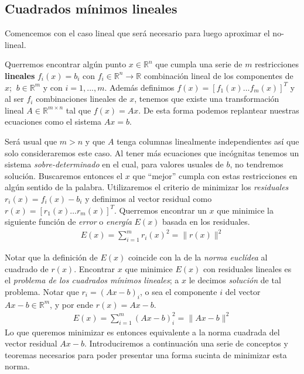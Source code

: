 \documentclass[ twoside,openright,titlepage,numbers=noenddot,%
                headinclude,footinclude,cleardoublepage=empty,abstract=on,
                BCOR=-5mm,paper=a4,fontsize=11pt
                ]{scrreprt}
\newcommand{\R}{\mathbb{R}}
\begin{document}
\hypertarget{cuadrados-muxednimos-lineales}{%
\subsection{Cuadrados mínimos
lineales}\label{cuadrados-muxednimos-lineales}}

Comencemos con el caso lineal que será necesario para luego aproximar el
no-lineal.

Querremos encontrar algún punto \(x \in \R^n\) que cumpla una serie de
\(m\) restricciones \textbf{lineales} \(f_i(x) = b_i\) con
\(f_i \in \R^n \rightarrow \R\) combinación lineal de los componentes de
\(x\); \(\ b \in \R^m\) y con \(i = 1, ..., m\). Además definimos
\(f(x) = [f_1(x) \dots f_m(x)]^T\) y al ser \(f_i\) combinaciones
lineales de \(x\), tenemos que existe una transformación lineal
\(A \in \R^{m \times n}\) tal que \(f(x) = Ax\). De esta forma podemos
replantear nuestras ecuaciones como el sistema \(Ax = b\).

Será usual que \(m > n\) y que \(A\) tenga columnas linealmente
independientes así que solo consideraremos este caso. Al tener más
ecuaciones que incógnitas tenemos un sistema \emph{sobre-determinado} en
el cual, para valores usuales de \(b\), no tendremos solución.
Buscaremos entonces el \(x\) que ``mejor'' cumpla con estas
restricciones en algún sentido de la palabra. Utilizaremos el criterio
de minimizar los \emph{residuales} \(r_i(x) = f_i(x) - b_i\) y definimos
al vector residual como \(r(x) = [r_1(x) \dots r_m(x)]^T\). Querremos
encontrar un \(x\) que minimice la siguiente función de \emph{error} o
\emph{energía} \(E(x)\) basada en los residuales. \begin{align}
E(x) = \sum_{i=1}^m{r_i(x) ^ 2} = \| r(x) \| ^ 2
\end{align}

Notar que la definición de \(E(x)\) coincide con la de la \emph{norma
euclídea} al cuadrado de \(r(x)\). Encontrar \(x\) que minimice \(E(x)\)
con residuales lineales es el \emph{problema de los cuadrados mínimos
lineales}; a \(x\) le decimos \emph{solución} de tal problema. Notar que
\(r_i = (Ax - b)_i\), o sea el componente \(i\) del vector
\(Ax - b \in \R^m\), y por ende \(r(x) = Ax - b\). \begin{align}
E(x) = \sum_{i=1}^m{(Ax - b)_i^2} = \| Ax - b \| ^ 2
\end{align} Lo que queremos minimizar es entonces equivalente a la norma
cuadrada del vector residual \(Ax - b\). Introduciremos a continuación
una serie de conceptos y teoremas necesarios para poder presentar una
forma sucinta de minimizar esta norma.
\end{document}
